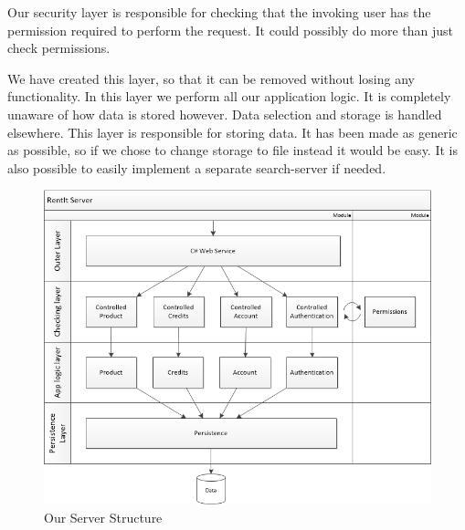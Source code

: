 Our security layer is responsible for checking that the invoking user has the permission required to perform the request. It could possibly do more than just check permissions.

We have created this layer, so that it can be removed without losing any functionality.
In this layer we perform all our application logic. It is completely unaware of how data is stored however. Data selection and storage is handled elsewhere.
This layer is responsible for storing data. It has been made as generic as possible, so if we chose to change storage to file instead it would be easy. It is also possible to easily implement a separate search-server if needed.

\begin{figure}[H]
  \includegraphics[width=\textwidth]{illustrations/ServerStructure.png}
  \caption{Our Server Structure}
  \label{fig:serverstructure}
\end{figure}
\newpage